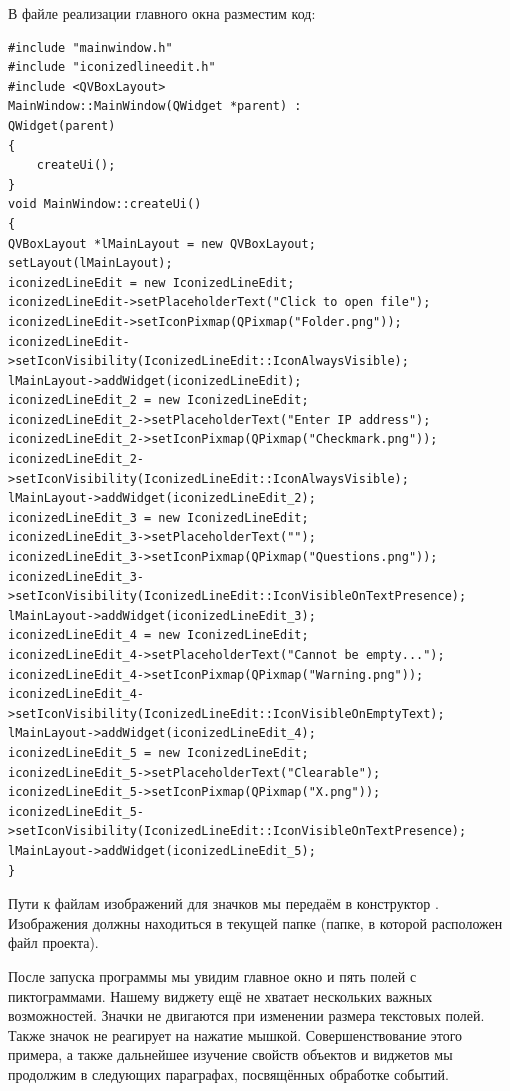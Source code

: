 В файле реализации главного окна разместим код:
\begin{lstlisting} 
#include "mainwindow.h"
#include "iconizedlineedit.h"
#include <QVBoxLayout>
MainWindow::MainWindow(QWidget *parent) :
QWidget(parent)
{
    createUi();
}
void MainWindow::createUi()
{
QVBoxLayout *lMainLayout = new QVBoxLayout;
setLayout(lMainLayout);
iconizedLineEdit = new IconizedLineEdit;
iconizedLineEdit->setPlaceholderText("Click to open file");
iconizedLineEdit->setIconPixmap(QPixmap("Folder.png"));
iconizedLineEdit->setIconVisibility(IconizedLineEdit::IconAlwaysVisible);
lMainLayout->addWidget(iconizedLineEdit);
iconizedLineEdit_2 = new IconizedLineEdit;
iconizedLineEdit_2->setPlaceholderText("Enter IP address");
iconizedLineEdit_2->setIconPixmap(QPixmap("Checkmark.png"));
iconizedLineEdit_2->setIconVisibility(IconizedLineEdit::IconAlwaysVisible);
lMainLayout->addWidget(iconizedLineEdit_2);
iconizedLineEdit_3 = new IconizedLineEdit;
iconizedLineEdit_3->setPlaceholderText("");
iconizedLineEdit_3->setIconPixmap(QPixmap("Questions.png"));
iconizedLineEdit_3->setIconVisibility(IconizedLineEdit::IconVisibleOnTextPresence);
lMainLayout->addWidget(iconizedLineEdit_3);
iconizedLineEdit_4 = new IconizedLineEdit;
iconizedLineEdit_4->setPlaceholderText("Cannot be empty...");
iconizedLineEdit_4->setIconPixmap(QPixmap("Warning.png"));
iconizedLineEdit_4->setIconVisibility(IconizedLineEdit::IconVisibleOnEmptyText);
lMainLayout->addWidget(iconizedLineEdit_4);
iconizedLineEdit_5 = new IconizedLineEdit;
iconizedLineEdit_5->setPlaceholderText("Clearable");
iconizedLineEdit_5->setIconPixmap(QPixmap("X.png"));
iconizedLineEdit_5->setIconVisibility(IconizedLineEdit::IconVisibleOnTextPresence);
lMainLayout->addWidget(iconizedLineEdit_5);
}
\end{lstlisting}

Пути к файлам изображений для значков мы передаём в конструктор . Изображения
должны находиться в текущей папке (папке, в которой расположен файл проекта).

После запуска программы мы увидим главное окно и пять полей с пиктограммами. Нашему виджету ещё не хватает нескольких
важных возможностей. Значки не двигаются при изменении размера текстовых полей. Также значок не реагирует на нажатие
мышкой. Совершенствование этого примера, а также дальнейшее изучение свойств объектов и виджетов мы продолжим в
следующих параграфах, посвящённых обработке событий.

